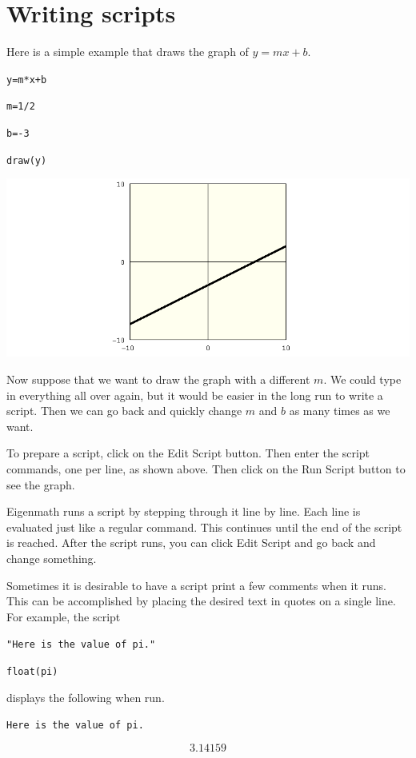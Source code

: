 \section*{Writing scripts}
Here is a simple example that draws the graph of $y=mx+b$.

\medskip
\verb$y=m*x+b$

\verb$m=1/2$

\verb$b=-3$

\verb$draw(y)$

\begin{center}
\includegraphics[scale=0.4]{1.png}
\end{center}

\noindent
Now suppose that we want to draw the graph
with a different $m$.
We could type in everything all over again, but it would be easier
in the long run to write a script.
Then we can go back and quickly change $m$ and $b$ as many times as we want.

\medskip
\noindent
To prepare a script, click on the Edit Script button.
Then enter the script commands, one per line, as shown above.
Then click on the Run Script button to see the graph.

\medskip
\noindent
Eigenmath runs a script by stepping through it line by line.
Each line is evaluated just like a regular command.
This continues until the end of the script is reached.
After the script runs, you can click Edit Script and go back and change something.

\newpage

\noindent
Sometimes it is desirable to have a script print a few comments when it runs.
This can be accomplished by placing the desired text in quotes
on a single line.
For example, the script

\medskip
\verb$"Here is the value of pi."$

\verb$float(pi)$

\medskip
\noindent
displays the following when run.

\medskip
\verb$Here is the value of pi.$

$$3.14159$$

